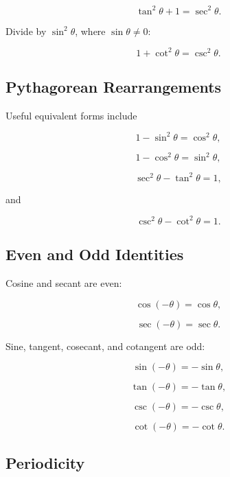 \[
\boxed{
\tan^2\theta+1
=
\sec^2\theta.
}
\]

Divide by \(\sin^2\theta\), where \(\sin\theta\neq0\):

\[
\boxed{
1+\cot^2\theta
=
\csc^2\theta.
}
\]

\subsection{Pythagorean Rearrangements}
\label{subsec:pythagorean-trig-rearrangements}

Useful equivalent forms include

\[
\boxed{
1-\sin^2\theta
=
\cos^2\theta,
}
\]

\[
\boxed{
1-\cos^2\theta
=
\sin^2\theta,
}
\]

\[
\boxed{
\sec^2\theta-\tan^2\theta
=
1,
}
\]

and

\[
\boxed{
\csc^2\theta-\cot^2\theta
=
1.
}
\]

\subsection{Even and Odd Identities}
\label{subsec:even-odd-trig-identities}

Cosine and secant are even:

\[
\boxed{
\cos(-\theta)
=
\cos\theta,
}
\]

\[
\boxed{
\sec(-\theta)
=
\sec\theta.
}
\]

Sine, tangent, cosecant, and cotangent are odd:

\[
\boxed{
\sin(-\theta)
=
-\sin\theta,
}
\]

\[
\boxed{
\tan(-\theta)
=
-\tan\theta,
}
\]

\[
\boxed{
\csc(-\theta)
=
-\csc\theta,
}
\]

\[
\boxed{
\cot(-\theta)
=
-\cot\theta.
}
\]

\subsection{Periodicity}
\label{subsec:trig-periodicity-reference}

